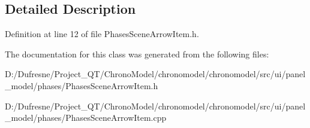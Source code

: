 \subsection{Detailed Description}


Definition at line 12 of file Phases\-Scene\-Arrow\-Item.\-h.



The documentation for this class was generated from the following files\-:\begin{DoxyCompactItemize}
\item 
D\-:/\-Dufresne/\-Project\-\_\-\-Q\-T/\-Chrono\-Model/chronomodel/chronomodel/src/ui/panel\-\_\-model/phases/Phases\-Scene\-Arrow\-Item.\-h\item 
D\-:/\-Dufresne/\-Project\-\_\-\-Q\-T/\-Chrono\-Model/chronomodel/chronomodel/src/ui/panel\-\_\-model/phases/Phases\-Scene\-Arrow\-Item.\-cpp\end{DoxyCompactItemize}
